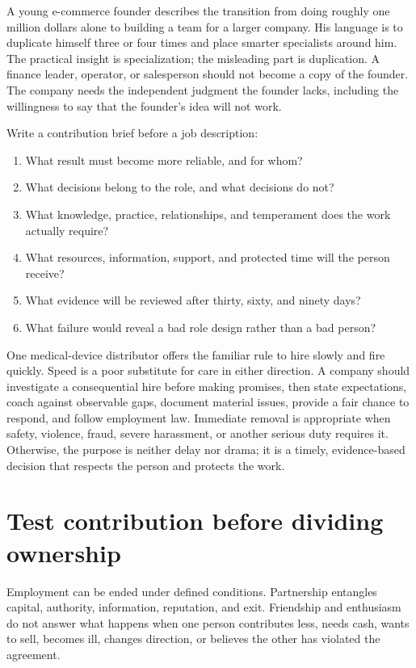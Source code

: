 A young e-commerce founder describes the transition from doing roughly one
million dollars alone to building a team for a larger company. His language is
to duplicate himself three or four times and place smarter specialists around
him. The practical insight is specialization; the misleading part is
duplication. A finance leader, operator, or salesperson should not become a
copy of the founder. The company needs the independent judgment the founder
lacks, including the willingness to say that the founder's idea will not work.

Write a contribution brief before a job description:

\begin{enumerate}[itemsep=0.16em]
\item What result must become more reliable, and for whom?
\item What decisions belong to the role, and what decisions do not?
\item What knowledge, practice, relationships, and temperament does the work
  actually require?
\item What resources, information, support, and protected time will the person
  receive?
\item What evidence will be reviewed after thirty, sixty, and ninety days?
\item What failure would reveal a bad role design rather than a bad person?
\end{enumerate}

One medical-device distributor offers the familiar rule to hire slowly and
fire quickly. Speed is a poor substitute for care in either direction. A
company should investigate a consequential hire before making promises, then
state expectations, coach against observable gaps, document material issues,
provide a fair chance to respond, and follow employment law. Immediate removal
is appropriate when safety, violence, fraud, severe harassment, or another
serious duty requires it. Otherwise, the purpose is neither delay nor drama;
it is a timely, evidence-based decision that respects the person and protects
the work.

\section{Test contribution before dividing ownership}

Employment can be ended under defined conditions. Partnership entangles
capital, authority, information, reputation, and exit. Friendship and enthusiasm
do not answer what happens when one person contributes less, needs cash, wants
to sell, becomes ill, changes direction, or believes the other has violated
the agreement.

